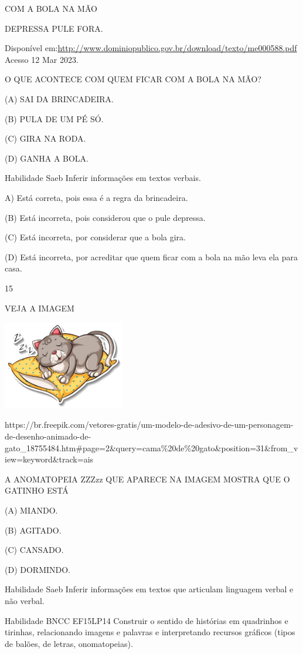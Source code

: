{{{{{{COM A BOLA NA MÃO

DEPRESSA PULE FORA.

Disponível
em:\url{http://www.dominiopublico.gov.br/download/texto/me000588.pdf}
Acesso 12 Mar 2023.

O QUE ACONTECE COM QUEM FICAR COM A BOLA NA MÃO?

(A) SAI DA BRINCADEIRA.

(B) PULA DE UM PÉ SÓ.

(C) GIRA NA RODA.

(D) GANHA A BOLA.

Habilidade Saeb Inferir informações em textos verbais.

A) Está correta, pois essa é a regra da brincadeira.

(B) Está incorreta, pois considerou que o pule depressa.

(C) Está incorreta, por considerar que a bola gira.

(D) Está incorreta, por acreditar que quem ficar com a bola na mão leva
ela para casa.

\num{15}

VEJA A IMAGEM

\includegraphics[width=2.09091in,height=1.52916in]{media/image161.jpeg}

https://br.freepik.com/vetores-gratis/um-modelo-de-adesivo-de-um-personagem-de-desenho-animado-de-gato\_18755484.htm\#page=2\&query=cama\%20de\%20gato\&position=31\&from\_view=keyword\&track=ais

A ANOMATOPEIA ZZZzz QUE APARECE NA IMAGEM MOSTRA QUE O GATINHO ESTÁ

(A) MIANDO.

(B) AGITADO.

(C) CANSADO.

(D) DORMINDO.

Habilidade Saeb Inferir informações em textos que articulam linguagem
verbal e não verbal.

Habilidade BNCC EF15LP14 Construir o sentido de histórias em quadrinhos
e tirinhas, relacionando imagens e palavras e interpretando recursos
gráficos (tipos de balões, de letras, onomatopeias).

}}}}}}
